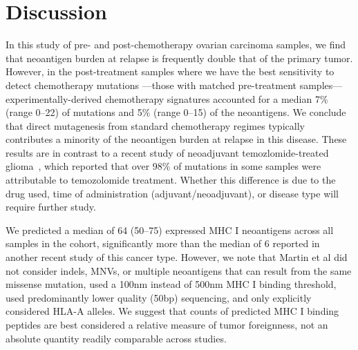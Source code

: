 \section*{Discussion}

In this study of pre- and post-chemotherapy ovarian carcinoma samples, we find that neoantigen burden at relapse is frequently double that of the primary tumor. However, in the post-treatment samples where we have the best sensitivity to detect chemotherapy mutations ---those with matched pre-treatment samples--- experimentally-derived chemotherapy signatures accounted for a median 7\% (range 0--22) of mutations and 5\% (range 0--15) of the neoantigens. We conclude that direct mutagenesis from standard chemotherapy regimes typically contributes a minority of the neoantigen burden at relapse in this disease. These results are in contrast to a recent study of neoadjuvant temozlomide-treated glioma~\cite{Johnson_2013}, which reported that over 98\% of mutations in some samples were attributable to temozolomide treatment. Whether this difference is due to the drug used, time of administration (adjuvant/neoadjuvant), or disease type will require further study.




We predicted a median of 64 (50--75) expressed MHC I neoantigens across all samples in the cohort, significantly more than the median of 6 reported in another recent study of this cancer type\cite{Martin_2016}. However, we note that Martin et al did not consider indels, MNVs, or multiple neoantigens that can result from the same missense mutation, used a 100nm instead of 500nm MHC I binding threshold, used predominantly lower quality (50bp) sequencing, and only explicitly considered HLA-A alleles. We suggest that counts of predicted MHC I binding peptides are best considered a relative measure of tumor foreignness, not an absolute quantity readily comparable across studies.

